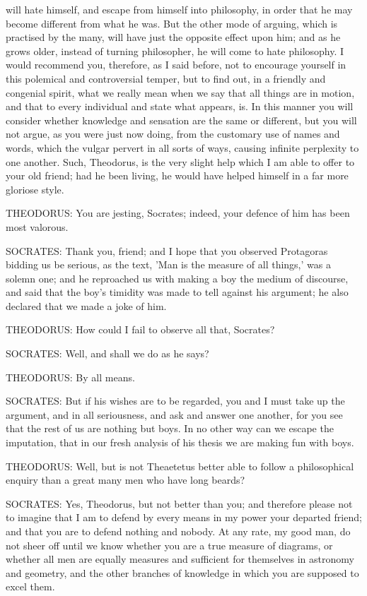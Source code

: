 will hate himself, and escape from himself into philosophy, in order
that he may become different from what he was. But the other mode of
arguing, which is practised by the many, will have just the opposite
effect upon him; and as he grows older, instead of turning philosopher,
he will come to hate philosophy. I would recommend you, therefore, as
I said before, not to encourage yourself in this polemical and
controversial temper, but to find out, in a friendly and congenial
spirit, what we really mean when we say that all things are in motion,
and that to every individual and state what appears, is. In this manner
you will consider whether knowledge and sensation are the same or
different, but you will not argue, as you were just now doing, from the
customary use of names and words, which the vulgar pervert in all sorts
of ways, causing infinite perplexity to one another. Such, Theodorus, is
the very slight help which I am able to offer to your old friend; had he
been living, he would have helped himself in a far more gloriose style.

THEODORUS: You are jesting, Socrates; indeed, your defence of him has
been most valorous.

SOCRATES: Thank you, friend; and I hope that you observed Protagoras
bidding us be serious, as the text, 'Man is the measure of all things,'
was a solemn one; and he reproached us with making a boy the medium of
discourse, and said that the boy's timidity was made to tell against his
argument; he also declared that we made a joke of him.

THEODORUS: How could I fail to observe all that, Socrates?

SOCRATES: Well, and shall we do as he says?

THEODORUS: By all means.

SOCRATES: But if his wishes are to be regarded, you and I must take up
the argument, and in all seriousness, and ask and answer one another,
for you see that the rest of us are nothing but boys. In no other way
can we escape the imputation, that in our fresh analysis of his thesis
we are making fun with boys.

THEODORUS: Well, but is not Theaetetus better able to follow a
philosophical enquiry than a great many men who have long beards?

SOCRATES: Yes, Theodorus, but not better than you; and therefore please
not to imagine that I am to defend by every means in my power your
departed friend; and that you are to defend nothing and nobody. At any
rate, my good man, do not sheer off until we know whether you are a
true measure of diagrams, or whether all men are equally measures and
sufficient for themselves in astronomy and geometry, and the other
branches of knowledge in which you are supposed to excel them.

